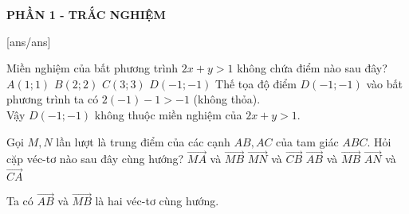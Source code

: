 
\begin{center}
	\textbf{PHẦN 1 - TRẮC NGHIỆM}
\end{center}
[ans/ans]
\begin{ex}%
     Miền nghiệm của bất phương trình $2 x+y>1$ không chứa điểm nào sau đây?
    \choice
     {$A(1 ; 1)$}
   {$B(2 ; 2)$}
    {$C(3 ; 3)$}
    {\True $D(-1 ;-1)$}
    \loigiai
    {
      Thế tọa độ điểm $D(-1 ;-1)$ vào bất phương trình ta có $2(-1)-1>-1$ (không thỏa).\\
      Vậy $D(-1 ;-1)$ không thuộc miền nghiệm của $2 x+y>1$.
    }
\end{ex}

\begin{ex}%
    Gọi $M, N$ lần lượt là trung điểm của các cạnh $A B, A C$ của tam giác $A B C$. Hỏi cặp véc-tơ nào sau đây cùng hướng?
    \choice
 { $\overrightarrow{M A}$ và $\overrightarrow{M B}$}
  {$\overrightarrow{M N}$ và $\overrightarrow{C B}$}
  {\True $\overrightarrow{A B}$ và $\overrightarrow{M B}$}
  {$\overrightarrow{A N}$ và $\overrightarrow{C A}$}
    \loigiai
    {
        \immini
        {
 Ta có $\overrightarrow{A B}$ và $\overrightarrow{M B}$ là hai véc-tơ cùng hướng.
        }
        {
        }
    }
\end{ex}
 
